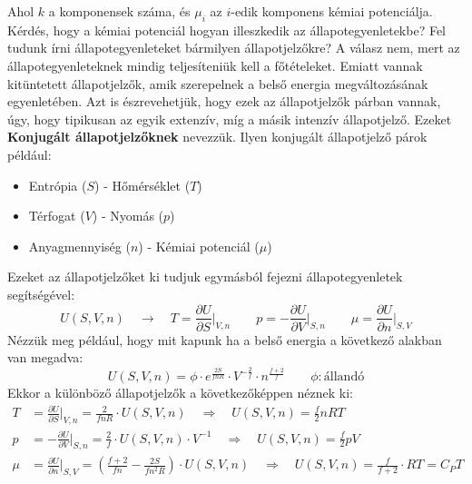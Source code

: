 \documentclass[../main.tex]{subfiles}
\begin{document}
Ahol $k$ a komponensek száma, és $\mu_i$ az $i$-edik komponens kémiai potenciálja.
\newline
\newline
Kérdés, hogy a kémiai potenciál hogyan illeszkedik az állapotegyenletekbe? Fel tudunk írni állapotegyenleteket bármilyen állapotjelzőkre?
A válasz nem, mert az állapotegyenleteknek mindig teljesíteniük kell a főtételeket. Emiatt vannak kitüntetett állapotjelzők, amik szerepelnek a
belső energia megváltozásának egyenletében. Azt is észrevehetjük, hogy ezek az állapotjelzők párban vannak, úgy, hogy tipikusan az egyik extenzív, míg a másik intenzív állapotjelző.
Ezeket \textbf{Konjugált állapotjelzőknek} nevezzük. Ilyen konjugált állapotjelző párok például:
\begin{itemize}
    \item Entrópia ($S$) - Hőmérséklet ($T$)
    \item Térfogat ($V$) - Nyomás ($p$)
    \item Anyagmennyiség ($n$) - Kémiai potenciál ($\mu$)
\end{itemize}
Ezeket az állapotjelzőket ki tudjuk egymásból fejezni állapotegyenletek segítségével:
\begin{equation}
    U(S, V, n) \quad \to \quad T = \frac{\partial U}{\partial S}\bigg|_{V,n} \qquad p = - \frac{\partial U}{\partial V}\bigg|_{S,n} \qquad \mu = \frac{\partial U}{\partial n}\bigg|_{S,V}
\end{equation}
Nézzük meg például, hogy mit kapunk ha a belső energia a következő alakban van megadva:
\begin{equation}
    U(S, V, n) = \phi \cdot e^{\frac{2S}{fnR}} \cdot V^{-\frac{2}{f}} \cdot n^{\frac{f + 2}{f}} \qquad \phi: \text{állandó}
\end{equation}
Ekkor a különböző állapotjelzők a következőképpen néznek ki:
\begin{equation}
    \begin{aligned}
        T &= \frac{\partial U}{\partial S}\bigg|_{V,n} = \frac{2}{f n R} \cdot U(S, V, n) \quad \Rightarrow \quad U(S, V, n) = \frac{f}{2} n R T \\
        p &= - \frac{\partial U}{\partial V}\bigg|_{S,n} = \frac{2}{f} \cdot U(S, V, n) \cdot V^{-1} \quad \Rightarrow \quad U(S, V, n) = \frac{f}{2} p V \\
        \mu &= \frac{\partial U}{\partial n}\bigg|_{S,V} = \left(\frac{f + 2}{f n} - \frac{2S}{f n^2 R}\right) \cdot U(S, V, n) \quad \Rightarrow \quad U(S, V, n) = \frac{f}{f + 2} \cdot RT = C_P T
    \end{aligned}   
\end{equation}
\end{document}
